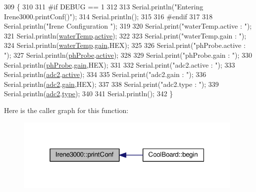 \begin{DoxyCode}
309 \{
310 
311 \textcolor{preprocessor}{#if DEBUG == 1 }
312 
313     Serial.println(\textcolor{stringliteral}{"Entering Irene3000.printConf()"});
314     Serial.println();
315 
316 \textcolor{preprocessor}{#endif }
317 
318     Serial.println(\textcolor{stringliteral}{"Irene Configuration "});
319 
320     Serial.print(\textcolor{stringliteral}{"waterTemp.active : "});
321     Serial.println(\hyperlink{classIrene3000_af05612c78c758ce9db316c75ad937130}{waterTemp}.\hyperlink{structIrene3000_1_1state_af7ff649f20b9a2fb6ca0f949ee9a25ce}{active});
322 
323     Serial.print(\textcolor{stringliteral}{"waterTemp.gain : "});
324     Serial.println(\hyperlink{classIrene3000_af05612c78c758ce9db316c75ad937130}{waterTemp}.\hyperlink{structIrene3000_1_1state_a1ecf69d38cb31ecaf6b3602a3f3e93cb}{gain},HEX);    
325 
326     Serial.print(\textcolor{stringliteral}{"phProbe.active : "});
327     Serial.println(\hyperlink{classIrene3000_a997a4ee466fa1d5416e07e444965dc9e}{phProbe}.\hyperlink{structIrene3000_1_1state_af7ff649f20b9a2fb6ca0f949ee9a25ce}{active});
328 
329     Serial.print(\textcolor{stringliteral}{"phProbe.gain : "});
330     Serial.println(\hyperlink{classIrene3000_a997a4ee466fa1d5416e07e444965dc9e}{phProbe}.\hyperlink{structIrene3000_1_1state_a1ecf69d38cb31ecaf6b3602a3f3e93cb}{gain},HEX);
331     
332     Serial.print(\textcolor{stringliteral}{"adc2.active : "});
333     Serial.println(\hyperlink{classIrene3000_aae3a95a1c83c766cd2f299ce471c337e}{adc2}.\hyperlink{structIrene3000_1_1state_af7ff649f20b9a2fb6ca0f949ee9a25ce}{active});
334 
335     Serial.print(\textcolor{stringliteral}{"adc2.gain : "});
336     Serial.println(\hyperlink{classIrene3000_aae3a95a1c83c766cd2f299ce471c337e}{adc2}.\hyperlink{structIrene3000_1_1state_a1ecf69d38cb31ecaf6b3602a3f3e93cb}{gain},HEX);
337 
338     Serial.print(\textcolor{stringliteral}{"adc2.type : "});
339     Serial.println(\hyperlink{classIrene3000_aae3a95a1c83c766cd2f299ce471c337e}{adc2}.\hyperlink{structIrene3000_1_1state_a9897a7e02727db6351d44006eec73799}{type});
340 
341     Serial.println();
342 \}
\end{DoxyCode}
Here is the caller graph for this function\+:\nopagebreak
\begin{figure}[H]
\begin{center}
\leavevmode
\includegraphics[width=313pt]{classIrene3000_a7bc2414100b5e19eacc6630fa34b2654_icgraph}
\end{center}
\end{figure}
\mbox{\label{classIrene3000_a852a170feea994ea1df01c6b245b5d9a}} 

